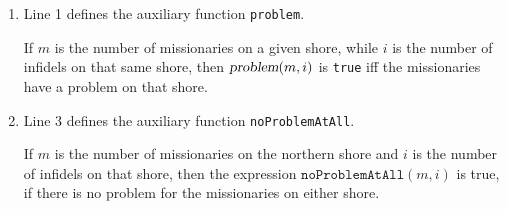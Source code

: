 \begin{enumerate}
\item Line 1 defines the auxiliary function \texttt{problem}.

      If $m$ is the number of missionaries on a given shore, while $i$ is the number of infidels on
      that same shore, then $\textsl{problem}(m, i)$ is \texttt{true} iff the missionaries have a problem on that
      shore.  
\item Line 3 defines the auxiliary function \texttt{noProblemAtAll}.  

      If $m$ is the number of missionaries on the northern shore and $i$ is the number of infidels on
      that shore, then the expression $\texttt{noProblemAtAll}(m, i)$ is true, if there is no problem
      for the missionaries on either shore.  


\end{enumerate}
